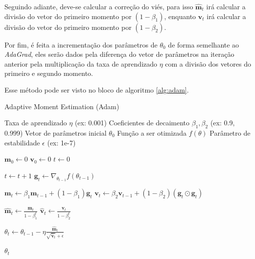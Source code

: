 Seguindo adiante, deve-se calcular a correção do viés, para isso $\mathbf{\hat{m}}_t$ irá calcular a divisão do vetor do primeiro momento por $(1 - \beta_1)$, enquanto $\mathbf{\hat{v}}_t$ irá calcular a divisão do vetor do primeiro momento por $(1 - \beta_2)$.

Por fim, é feita a incrementação dos parâmetros de $\theta_0$ de forma semelhante ao \textit{AdaGrad}, eles serão dados pela diferença do vetor de parâmetros na iteração anterior pela multiplicação da taxa de aprendizado $\eta$ com a divisão dos vetores do primeiro e segundo momento.

Esse método pode ser visto no bloco de algoritmo \ref{alg:adam}.

\begin{algorithm}[H]
    \caption{Adaptive Moment Estimation (Adam)}
    \label{alg:adam}
    \begin{algorithmic}[1]

    \Require Taxa de aprendizado $\eta$ (ex: 0.001)
    \Require Coeficientes de decaimento $\beta_1, \beta_2$ (ex: 0.9, 0.999)
    \Require Vetor de parâmetros inicial $\theta_0$
    \Require Função a ser otimizada $f(\theta)$
    \Require Parâmetro de estabilidade $\epsilon$ (ex: 1e-7)

    \State $\mathbf{m}_0 \leftarrow 0$ 
    \State $\mathbf{v}_0 \leftarrow 0$ 
    \State $t \leftarrow 0$ 

        \State $t \leftarrow t + 1$
        \State $\mathbf{g}_t \leftarrow \nabla_{\theta_{t-1}} f(\theta_{t-1})$
        
        \State $\mathbf{m}_t \leftarrow \beta_1 \mathbf{m}_{t-1} + (1 - \beta_1) \mathbf{g}_t$
        \State $\mathbf{v}_t \leftarrow \beta_2 \mathbf{v}_{t-1} + (1 - \beta_2) (\mathbf{g}_t \odot \mathbf{g}_t)$
        
        \State $\mathbf{\hat{m}}_t \leftarrow \frac{\mathbf{m}_t}{1 - \beta_1^t}$
        \State $\mathbf{\hat{v}}_t \leftarrow \frac{\mathbf{v}_t}{1 - \beta_2^t}$
        
        \State $\theta_t \leftarrow \theta_{t-1} - \eta  \frac{\mathbf{\hat{m}}_t}{\sqrt{\mathbf{\hat{v}}_t} + \epsilon}$
    \EndWhile

    \State \Return $\theta_t$ 
    \end{algorithmic}
\end{algorithm}

